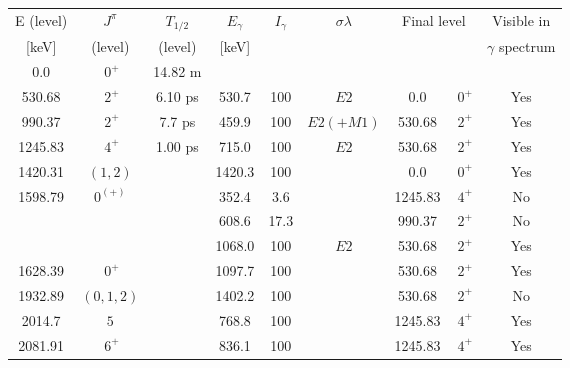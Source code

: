 \begin{tabular}{ccccccccc}
\hline
E (level) & $J^\pi$   & $T_{1/2}$  & $E_\gamma$ & $I_\gamma$ & $\sigma \lambda$ & \multicolumn{2}{c}{Final level}  & Visible in        \\
{[keV]}   & (level)   & (level)    & [keV]      &            &                  &                 &                & $\gamma$ spectrum \\
\hline
0.0       & $~0^+$    &   14.82 m  &            &            &                  &                 &                &                   \\
530.68    & $~2^+$    &    6.10 ps &  530.7     & 100        & $E2$             &    0.0          & $~0^+$         & Yes               \\
990.37    & $~2^+$    &    7.7 ps  &  459.9     & 100        & $E2(+M1)$        &  530.68         & $~2^+$         & Yes               \\
1245.83   & $~4^+$    &    1.00 ps &  715.0     & 100        & $E2$             &  530.68         & $~2^+$         & Yes               \\
1420.31   & $(1,2)$   &            & 1420.3     & 100        &                  &    0.0          & $~0^+$         & Yes               \\
1598.79   & $0^{(+)}$ &            &  352.4     &   3.6      &                  & 1245.83         & $~4^+$         & No                \\
          &           &            &  608.6     &  17.3      &                  &  990.37         & $~2^+$         & No                \\
          &           &            & 1068.0     & 100        & $E2$             &  530.68         & $~2^+$         & Yes               \\
1628.39   & $~0^+$    &            & 1097.7     & 100        &                  &  530.68         & $~2^+$         & Yes               \\
1932.89   & $(0,1,2)$ &            & 1402.2     & 100        &                  &  530.68         & $~2^+$         & No                \\
2014.7    & $5$       &            &  768.8     & 100        &                  & 1245.83         & $~4^+$         & Yes               \\
2081.91   & $~6^+$    &            &  836.1     & 100        &                  & 1245.83         & $~4^+$         & Yes               \\

\end{tabular}
